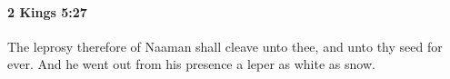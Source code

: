 
		\paragraph{2 Kings 5:27} %
			\label{2KINGS-5-27}

			The leprosy therefore of Naaman shall cleave unto thee, and unto thy seed for ever. And he went out from his presence a leper as white as snow.

